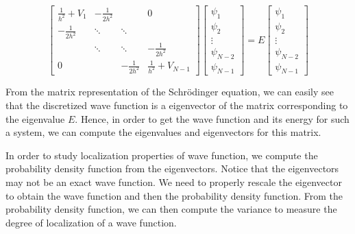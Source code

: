 \begin{equation} \label{eq:matrix1}
\left[ \begin{matrix}
\frac{1}{h^2}+V_1 & -\frac{1}{2h^2} & & 0\\
-\frac{1}{2h^2} & \ddots & \ddots & \\
& \ddots & \ddots & -\frac{1}{2h^2} \\
0 & & -\frac{1}{2h^2} & \frac{1}{h^2}+V_{N-1} \end{matrix} \right]
\begin{bmatrix}
    \psi_{1}  \\
    \psi_{2}  \\
    \vdots  \\
    \psi_{N-2}\\
    \psi_{N-1}
    \end{bmatrix} = E\begin{bmatrix}
    \psi_{1}  \\
    \psi_{2}  \\
    \vdots  \\
    \psi_{N-2}\\
    \psi_{N-1}
    \end{bmatrix}
\end{equation}

From the matrix representation of the Schr\"{o}dinger equation, we can easily see that the discretized wave function is a eigenvector of the matrix corresponding to the eigenvalue $E$. Hence, in order to get the wave function and its energy for such a system, we can compute the eigenvalues and eigenvectors for this matrix. 

In order to study localization properties of wave function, we compute the probability density function from the eigenvectors. Notice that the eigenvectors may not be an exact wave function. We need to properly rescale the eigenvector to obtain the wave function and then the probability density function. 
From the probability density function, we can then compute the variance to measure the degree of localization of a wave function. 

